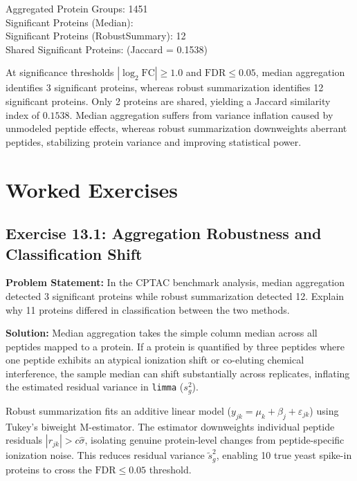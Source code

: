 \documentclass[11pt,twoside,openright]{book}
\begin{document}
\begin{routput}
Aggregated Protein Groups: 1451\\
Significant Proteins (Median):\enspace\enspace\enspace\enspace\enspace\enspace\enspace{}\\
Significant Proteins (RobustSummary): 12\\
Shared Significant Proteins:\enspace\enspace\enspace\enspace\enspace\enspace\enspace\enspace{} (Jaccard = 0.1538)
\end{routput}

At significance thresholds $|\log_2\text{FC}| \ge 1.0$ and $\text{FDR} \le 0.05$, median aggregation identifies 3 significant proteins, whereas robust summarization identifies 12 significant proteins. Only 2 proteins are shared, yielding a Jaccard similarity index of $0.1538$. Median aggregation suffers from variance inflation caused by unmodeled peptide effects, whereas robust summarization downweights aberrant peptides, stabilizing protein variance and improving statistical power.

\FloatBarrier
\section{Worked Exercises}
\label{sec:worked_exercises}

\subsection*{Exercise 13.1: Aggregation Robustness and Classification Shift}
\noindent\textbf{Problem Statement:}\enspace
In the CPTAC benchmark analysis, median aggregation detected 3 significant proteins while robust summarization detected 12. Explain why 11 proteins differed in classification between the two methods.

\noindent\textbf{Solution:}\enspace
Median aggregation takes the simple column median across all peptides mapped to a protein. If a protein is quantified by three peptides where one peptide exhibits an atypical ionization shift or co-eluting chemical interference, the sample median can shift substantially across replicates, inflating the estimated residual variance in \texttt{limma} ($s_g^2$).

Robust summarization fits an additive linear model ($y_{jk} = \mu_k + \beta_j + \varepsilon_{jk}$) using Tukey's biweight M-estimator. The estimator downweights individual peptide residuals $|r_{jk}| > c \hat{\sigma}$, isolating genuine protein-level changes from peptide-specific ionization noise. This reduces residual variance $\tilde{s}_g^2$, enabling 10 true yeast spike-in proteins to cross the $\text{FDR} \le 0.05$ threshold.
\end{document}
